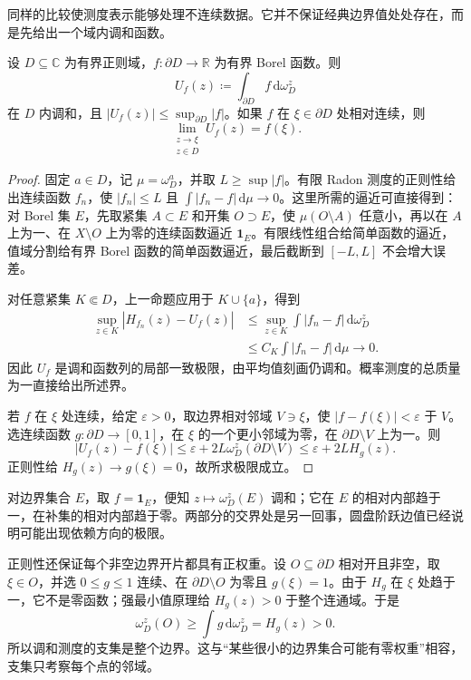 同样的比较使测度表示能够处理不连续数据。它并不保证经典边界值处处存在，而是先给出一个域内调和函数。

\begin{proposition}\label{b3:prop:16-borel-extension}
设 \(D\subseteq\mathbb C\) 为有界正则域，\(f:\partial D\to\mathbb R\) 为有界 Borel 函数。则
\[
 U_f(z)\coloneqq\int_{\partial D}f\,\mathrm d\omega_D^z
\]
在 \(D\) 内调和，且 \(|U_f(z)|\le\sup_{\partial D}|f|\)。如果 \(f\) 在 \(\xi\in\partial D\) 处相对连续，则
\[
 \lim_{\substack{z\to\xi\\z\in D}}U_f(z)=f(\xi).
\]
\end{proposition}
\begin{proof}
固定 \(a\in D\)，记 \(\mu=\omega_D^a\)，并取 \(L\ge\sup|f|\)。有限 Radon 测度的正则性给出连续函数 \(f_n\)，使 \(|f_n|\le L\) 且 \(\int|f_n-f|\,\mathrm d\mu\to0\)。这里所需的逼近可直接得到：对 Borel 集 \(E\)，先取紧集 \(A\subset E\) 和开集 \(O\supset E\)，使 \(\mu(O\setminus A)\) 任意小，再以在 \(A\) 上为一、在 \(X\setminus O\) 上为零的连续函数逼近 \(\mathbf1_E\)。有限线性组合给简单函数的逼近，值域分割给有界 Borel 函数的简单函数逼近，最后截断到 \([-L,L]\) 不会增大误差。

对任意紧集 \(K\Subset D\)，上一命题应用于 \(K\cup\{a\}\)，得到
\[
 \begin{aligned}
 \sup_{z\in K}|H_{f_n}(z)-U_f(z)|
 &\le\sup_{z\in K}\int|f_n-f|\,\mathrm d\omega_D^z\\
 &\le C_K\int|f_n-f|\,\mathrm d\mu\longrightarrow0.
 \end{aligned}
\]
因此 \(U_f\) 是调和函数列的局部一致极限，由平均值刻画仍调和。概率测度的总质量为一直接给出所述界。

若 \(f\) 在 \(\xi\) 处连续，给定 \(\varepsilon>0\)，取边界相对邻域 \(V\ni\xi\)，使 \(|f-f(\xi)|<\varepsilon\) 于 \(V\)。选连续函数 \(g:\partial D\to[0,1]\)，在 \(\xi\) 的一个更小邻域为零，在 \(\partial D\setminus V\) 上为一。则
\[
 |U_f(z)-f(\xi)|\le\varepsilon+2L\omega_D^z(\partial D\setminus V)
 \le\varepsilon+2LH_g(z).
\]
正则性给 \(H_g(z)\to g(\xi)=0\)，故所求极限成立。
\end{proof}

对边界集合 \(E\)，取 \(f=\mathbf1_E\)，便知 \(z\mapsto\omega_D^z(E)\) 调和；它在 \(E\) 的相对内部趋于一，在补集的相对内部趋于零。两部分的交界处是另一回事，圆盘阶跃边值已经说明可能出现依赖方向的极限。

\ProseParagraphBreak
正则性还保证每个非空边界开片都具有正权重。设 \(O\subseteq\partial D\) 相对开且非空，取 \(\xi\in O\)，并选 \(0\le g\le1\) 连续、在 \(\partial D\setminus O\) 为零且 \(g(\xi)=1\)。由于 \(H_g\) 在 \(\xi\) 处趋于一，它不是零函数；强最小值原理给 \(H_g(z)>0\) 于整个连通域。于是
\[
 \omega_D^z(O)\ge\int g\,\mathrm d\omega_D^z=H_g(z)>0.
\]
所以调和测度的支集是整个边界。这与“某些很小的边界集合可能有零权重”相容，支集只考察每个点的邻域。

